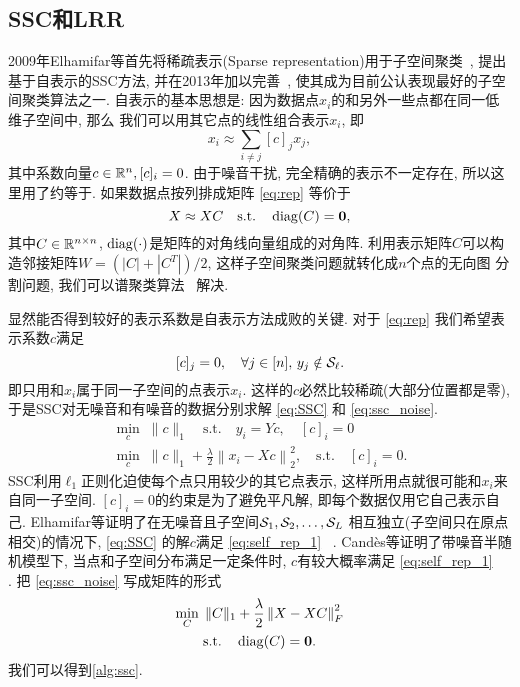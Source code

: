 \subsection{SSC和LRR}
2009年Elhamifar等首先将稀疏表示(Sparse representation)用于子空间聚类~\cite{elhamifar2009sparse}, 
提出基于自表示的SSC方法, 并在2013年加以完善~\cite{elhamifar2013sparse}, 使其成为目前公认表现最好的子空间聚类算法之一.
自表示的基本思想是: 因为数据点\(x_i\)的和另外一些点都在同一低维子空间中, 那么 
我们可以用其它点的线性组合表示\(x_i\), 即
\begin{equation}
  x_i \approx \sum_{i\neq j} [c]_j x_j, 
  \label{eq:rep}
\end{equation}
其中系数向量\(c\in \mathbb{R}^n, [c]_i = 0\). 
由于噪音干扰, 完全精确的表示不一定存在, 所以这里用了约等于.
如果数据点按列排成矩阵 \eqref{eq:rep} 等价于
\begin{equation}
  X \approx XC \quad \text{s.t.}\quad \operatorname{diag}(C) = \mathbf{0},
  \label{eq:matrix_rep}
\end{equation}
其中\(C\in \mathbb{R}^{n\times n}\), \(\operatorname{diag}(\cdot)\)是矩阵的对角线向量组成的对角阵.
利用表示矩阵\(C\)可以构造邻接矩阵\(W=(|C|+|C^T|)/2\),
这样子空间聚类问题就转化成\(n\)个点的无向图
分割问题, 我们可以谱聚类算法~\cite{ng2002spectral} 解决.

显然能否得到较好的表示系数是自表示方法成败的关键.
对于 \eqref{eq:rep} 我们希望表示系数\(c\)满足
\begin{equation}\label{eq:self_rep_1}
  [c]_j = 0, \quad  \forall j\in [n], \,y_j \notin \mathcal{S}_\ell .
\end{equation}
即只用和\(x_i\)属于同一子空间的点表示\(x_i\).
这样的\(c\)必然比较稀疏(大部分位置都是零), 
于是SSC对无噪音和有噪音的数据分别求解 \eqref{eq:SSC} 和 \eqref{eq:ssc_noise}.  
\begin{gather}
  \min_{c} \; \|c\|_1\quad \text{s.t.}\quad y_i=Yc, \quad [c]_i=0 \label{eq:SSC}\\
  \min_{c} \; \|c\|_1+\frac{\lambda}{2}\left\|x_i-Xc\right\|_2^2, \quad \text{s.t.} \quad
  [c]_i = 0. \label{eq:ssc_noise}
\end{gather}
SSC利用\(\ell_1\)正则化迫使每个点只用较少的其它点表示,
这样所用点就很可能和\(x_i\)来自同一子空间.
\([c]_i = 0\)的约束是为了避免平凡解,
即每个数据仅用它自己表示自己.
Elhamifar等证明了在无噪音且子空间\(\mathcal{S}_1, \mathcal{S}_2, \ldots, \mathcal{S}_L\)
相互独立(子空间只在原点相交)的情况下,
 \eqref{eq:SSC} 的解\(c\)满足 \eqref{eq:self_rep_1} ~\cite{elhamifar2013sparse}.
Cand\`{e}s等证明了带噪音半随机模型下, 当点和子空间分布满足一定条件时,
\(c\)有较大概率满足 \eqref{eq:self_rep_1} ~\cite{soltanolkotabi2014robust} .
把 \eqref{eq:ssc_noise} 写成矩阵的形式
\begin{equation}
  \begin{gathered}
    \min_C \; \|C\|_1+\frac{\lambda}{2}\left\|X-XC\right\|_F^2\\
    \text{s.t.} \quad \operatorname{diag}(C)=\mathbf{0}.
  \end{gathered}
  \label{eq:ssc_matrix}
\end{equation}
我们可以得到\autoref{alg:ssc}.  

